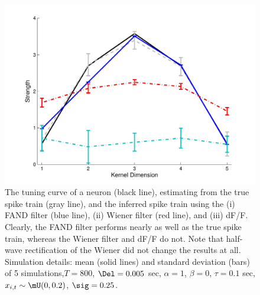 \begin{figure}[H]
\centering \includegraphics[width=.9\linewidth]{../figs/kernel}
\caption{The tuning curve of a neuron (black line), estimating from the true spike train (gray line), and the inferred spike train using the (i) FAND filter (blue line), (ii) Wiener filter (red line), and (iii) dF/F.  Clearly, the FAND filter performs nearly as well as the true spike train, whereas the Wiener filter and dF/F do not.  Note that half-wave rectification of the Wiener did not change the results at all.  Simulation details: mean (solid lines) and standard deviation (bars) of 5 simulations,$T=800$, $\Del=0.005$ sec, $\alpha=1$, $\beta=0$, $\tau=0.1$ sec, $x_{i,t} \sim \mU(0,0.2)$,  $\sig=0.25$.} \label{fig:kernel}
\end{figure}




